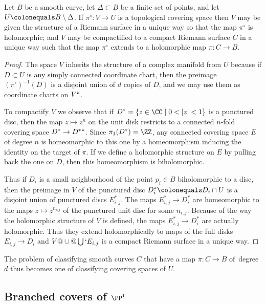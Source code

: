\begin{theorem}
 Let $B$ be a smooth curve, let $\Delta\subset B$ be a finite set of
 points, and let $U \colonequals  B\setminus \Delta$.
If $\pi^\circ : V \to U$ is a topological covering space then $V$ may
be given the structure of a
Riemann surface
%
in a unique way so that
the map $\pi^\circ$ is holomorphic; and $V$ may be compactified to a
compact Riemann surface $C$ in a unique way such that the map $\pi^\circ$
extends to a holomorphic map $\pi : C \to B$.
\unif
\end{theorem}

\begin{proof}
The space $V$ inherits the structure of a complex manifold from $U$
because if $D \subset U$ is any simply connected coordinate chart,
then the preimage $({\pi^\circ})^{-1}(D)$ is a disjoint union of $d$
copies of $D$, and we may use them as coordinate charts on $V` `$.

To compactify $V$ we observe that if $D^* = \{ z \in \CC \mid 0 < |z|
< 1 \}$ is a punctured disc, then
the map 
$z \mapsto z^n$ on the unit disk
restricts to a connected $n$-fold covering
space $D^*\to D^*` `$.
Since $\pi_1(D^*) = \ZZ$, any connected covering space $E$ of degree $n$
is homeomorphic to this one
by a homeomorphism inducing the identity on the target of $\pi$.
If we  define a holomorphic structure on $E$ by pulling back the one on
$D$, then
this homeomorphism is biholomorphic.

Thus if $D_i$ is a small neighborhood of the point $p_i \in B$
biholomorphic to a disc, then the preimage  in $V$ of the punctured
disc $D_i^* \colonequals  D_i \cap U$ is a disjoint union of punctured discs
$E_{i,j}^{*}$. The maps $E^{*}_{i,j} \to D_{i}^{*}$
are homeomorphic to the maps $z\mapsto z^{n_{i,j}}$ 
of the punctured unit disc
for some
$n_{i,j}$. Because of the way the holomorphic structure
of $V$ is defined, the maps 
$E^{*}_{i,j} \to D_{i}^{*}$
are actually
holomorphic. Thus they extend holomorphically
to maps of the full disks $E_{i,j}\to D_{i}$ and $V@\cup@ \bigcup` E_{i,j}$
is a compact Riemann surface in a unique way.
\end{proof}

The problem of classifying smooth curves $C$ that have a map $\pi : C \to B$
of~degree $d$ thus becomes one of classifying covering spaces of $U$.
%

\subsection*{Branched covers of $\PP^1$}

